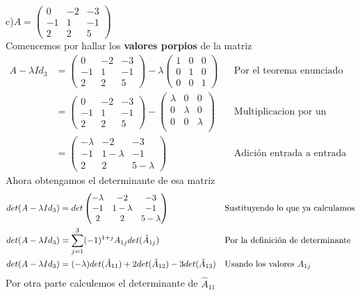 \documentclass[letterpaper]{article}
\renewcommand{\*}{\cdot}
\newcommand{\Iden}{\begin{pmatrix}
		1 & 0 & 0\\
		0 & 1 & 0\\
		0 & 0 & 1 
\end{pmatrix}}
\theoremstyle{definition}
\begin{document}
c)$A = \begin{pmatrix} 0 & -2 & -3 \\ -1 & 1 & -1 \\ 2 & 2 & 5 \end{pmatrix}$\\
Comencemos por hallar los \textbf{valores porpios} de la matriz 
\begin{align*}
	A - \lambda Id_3 & = \begin{pmatrix} 0 & -2 & -3 \\ -1 & 1 & -1 \\ 2 & 2 & 5 \end{pmatrix} - \lambda \Iden && \text{Por el teorema enunciado al inicio del ejercicio}\\
	& = \begin{pmatrix} 0 & -2 & -3 \\ -1 & 1 & -1 \\ 2 & 2 & 5 \end{pmatrix} - \begin{pmatrix}
		\lambda & 0 & 0\\
		0 & \lambda & 0\\
		0 & 0 & \lambda \\
	\end{pmatrix} && \text{Multiplicacion por un escalar} \\
	&= \begin{pmatrix} -\lambda & -2 & -3 \\ -1 & 1-\lambda & -1 \\ 2 & 2 & 5-\lambda \end{pmatrix} && \text{Adición entrada a entrada}
\end{align*}
Ahora obtengamos el determinante de esa matriz
\begin{align*}
	det(A - \lambda Id_3) & = det\begin{pmatrix} -\lambda & -2 & -3 \\ -1 & 1-\lambda & -1 \\ 2 & 2 & 5-\lambda \end{pmatrix} && \text{Sustituyendo lo que ya calculamos}\\
	det(A - \lambda Id_3) & = \sum_{j = 1}^{3}(-1)^{1+j} A_{1j}det(\hat{A}_{1j}) && \text{Por la definición de determinante} \\
	det(A - \lambda Id_3) & = (-\lambda) det(\hat{A}_{11}) + 2det(\hat{A}_{12}) - 3det(\hat{A}_{13}) && \text{Usando los valores $ A_{1j} $}
\end{align*}
Por otra parte calculemos el determinante de $ \hat{A}_{11} $ 
\end{document}
